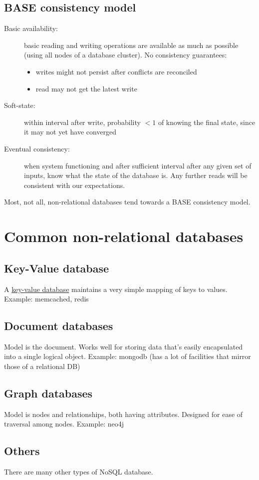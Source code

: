 \documentclass[slides]{pgnotes}
\begin{document}
\subsection{BASE consistency model}

\begin{description}
\item[Basic availability:]
  basic reading and writing operations are available as much as possible (using all nodes of a database cluster). No consistency guarantees:
    \begin{itemize}
    \item writes might not persist after conflicts are reconciled
    \item read may not get the latest write
    \end{itemize}
  \item[Soft-state:] within interval after write, probability $<1$ of knowing the final state, since it may not yet have converged
  \item[Eventual consistency:] when system functioning and after sufficient interval after any given set of inputs, know what the state of the database is. Any further reads will be consistent with our expectations. 
\end{description}

Most, not all, non-relational databases tend towards a BASE consistency model. 

\section{Common non-relational databases}

\subsection{Key-Value database}

A \href{https://en.wikipedia.org/wiki/Key-value_database}{key-value database} maintains a very simple mapping of keys to values.
Example: memcached, redis

\subsection{Document databases}

Model is the document.
Works well for storing data that's easily encapsulated into a single logical object.
Example: mongodb (has a lot of facilities that mirror those of a relational DB)

\subsection{Graph databases}

Model is nodes and relationships, both having attributes.
Designed for ease of traversal among nodes.
Example: neo4j

\subsection{Others}

There are many other types of NoSQL database.



\end{document}
